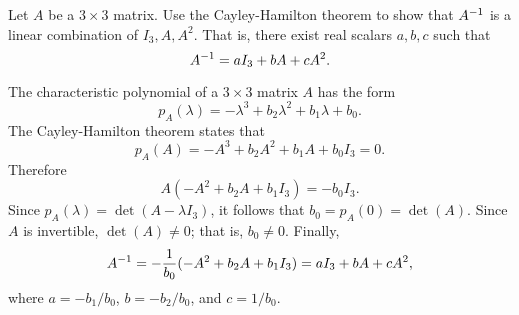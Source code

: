 \documentclass{ximera}
\begin{document}
\begin{exercise} \label{c10.5.5C}
Let $A$ be a $3\times 3$ matrix.  Use the Cayley-Hamilton theorem to show that
$A^{-1}$ is a linear combination of $I_3,A,A^2$.  That is, there exist real 
scalars $a,b,c$ such that 
\[
A^{-1} = aI_3 + bA + cA^2.
\]

\begin{solution}

The characteristic polynomial of a $3\times 3$ matrix $A$ has the form 
\[
p_A(\lambda) = -\lambda^3 + b_2\lambda^2 + b_1\lambda + b_0.
\]
The Cayley-Hamilton theorem states that 
\[
p_A(A) = -A^3 + b_2A^2 + b_1A + b_0I_3 = 0.
\]
Therefore
\[
A(-A^2 +b_2A +b_1I_3) = -b_0I_3.
\]
Since $p_A(\lambda) =\det(A-\lambda I_3)$, it follows that $b_0=p_A(0)=\det(A)$.
Since $A$ is invertible, $\det(A)\neq 0$; that is, $b_0\neq 0$.  Finally, 
\[
A^{-1} = -\frac{1}{b_0}(-A^2+b_2A+b_1I_3) = aI_3 + bA + cA^2,
\]
where $a = -b_1/b_0$, $b = -b_2/b_0$, and $c=1/b_0$.



\end{solution}
\end{exercise}
\end{document}

